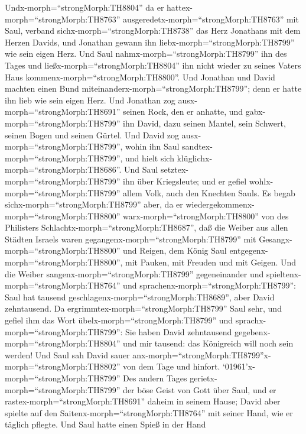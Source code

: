  Undx-morph=``strongMorph:TH8804'' da er
hattex-morph=``strongMorph:TH8763''
ausgeredetx-morph=``strongMorph:TH8763'' mit Saul, verband
sichx-morph=``strongMorph:TH8738'' das Herz Jonathans mit dem Herzen
Davids, und Jonathan gewann ihn liebx-morph=``strongMorph:TH8799'' wie
sein eigen Herz.  Und Saul
nahmx-morph=``strongMorph:TH8799'' ihn des Tages und
ließx-morph=``strongMorph:TH8804'' ihn nicht wieder zu seines Vaters
Haus kommenx-morph=``strongMorph:TH8800''.  Und Jonathan und
David machten einen Bund miteinanderx-morph=``strongMorph:TH8799''; denn
er hatte ihn lieb wie sein eigen Herz.  Und Jonathan zog
ausx-morph=``strongMorph:TH8691'' seinen Rock, den er anhatte, und
gabx-morph=``strongMorph:TH8799'' ihn David, dazu seinen Mantel, sein
Schwert, seinen Bogen und seinen Gürtel.  Und David zog
ausx-morph=``strongMorph:TH8799'', wohin ihn Saul
sandtex-morph=``strongMorph:TH8799'', und hielt sich
klüglichx-morph=``strongMorph:TH8686''. Und Saul
setztex-morph=``strongMorph:TH8799'' ihn über Kriegsleute; und er gefiel
wohlx-morph=``strongMorph:TH8799'' allem Volk, auch den Knechten Sauls.
 Es begab sichx-morph=``strongMorph:TH8799'' aber, da er
wiedergekommenx-morph=``strongMorph:TH8800''
warx-morph=``strongMorph:TH8800'' von des Philisters
Schlachtx-morph=``strongMorph:TH8687'', daß die Weiber aus allen Städten
Israels waren gegangenx-morph=``strongMorph:TH8799'' mit
Gesangx-morph=``strongMorph:TH8800'' und Reigen, dem König Saul
entgegenx-morph=``strongMorph:TH8800'', mit Pauken, mit Freuden und mit
Geigen.  Und die Weiber sangenx-morph=``strongMorph:TH8799''
gegeneinander und spieltenx-morph=``strongMorph:TH8764'' und
sprachenx-morph=``strongMorph:TH8799'': Saul hat tausend
geschlagenx-morph=``strongMorph:TH8689'', aber David zehntausend.
 Da ergrimmtex-morph=``strongMorph:TH8799'' Saul sehr, und
gefiel ihm das Wort übelx-morph=``strongMorph:TH8799'' und
sprachx-morph=``strongMorph:TH8799'': Sie haben David zehntausend
gegebenx-morph=``strongMorph:TH8804'' und mir tausend: das Königreich
will noch sein werden!  Und Saul sah David sauer
anx-morph=``strongMorph:TH8799''x-morph=``strongMorph:TH8802'' von dem
Tage und hinfort. 
`01961'\textbar x-morph=``strongMorph:TH8799'' Des andern Tages
gerietx-morph=``strongMorph:TH8799'' der böse Geist von Gott über Saul,
und er rastex-morph=``strongMorph:TH8691'' daheim in seinem Hause; David
aber spielte auf den Saitenx-morph=``strongMorph:TH8764'' mit seiner
Hand, wie er täglich pflegte. Und Saul hatte einen Spieß in der Hand
